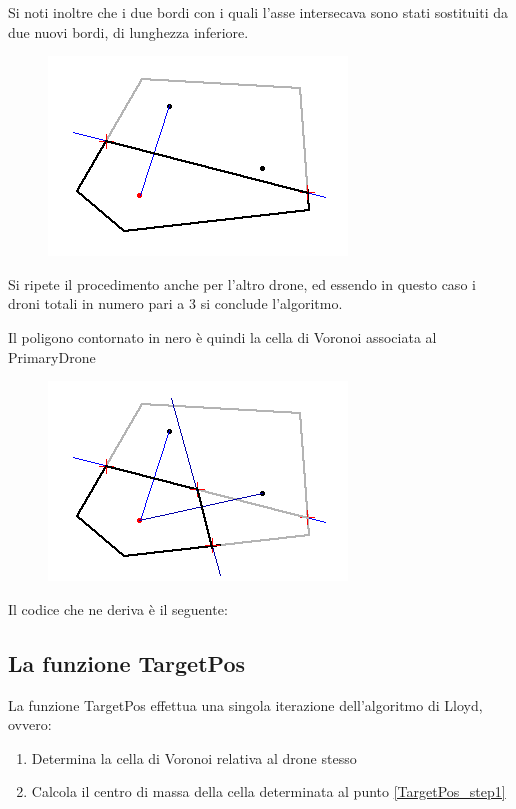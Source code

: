 \documentclass[10pt,a4paper]{article}
\newcommand{\modelicaclass}[1]{

}
\newcommand{\name}[1]{{\color{purple}#1}}
\begin{document}
Si noti inoltre che i due bordi con i quali l'asse intersecava sono stati sostituiti da due nuovi bordi, di lunghezza inferiore.

\begin{figure}[H]
\centering
\includegraphics[scale=0.7]{voronoi3.png}
\end{figure}

Si ripete il procedimento anche per l'altro drone, ed essendo in questo caso i droni totali in numero pari a 3 si conclude l'algoritmo.

Il poligono contornato in nero è quindi la cella di Voronoi associata al \name{PrimaryDrone}

\begin{figure}[H]
\centering
\includegraphics[scale=0.7]{voronoi4.png}
\end{figure}

Il codice che ne deriva è il seguente:

\modelicaclass{VoronoiCell.mo}

\subsection{La funzione \name{TargetPos}}

La funzione \name{TargetPos} effettua una singola iterazione dell'algoritmo di Lloyd, ovvero:

\begin{enumerate}
	\item \label{TargetPos_step1} Determina la cella di Voronoi relativa al drone stesso
	\item Calcola il centro di massa della cella determinata al punto \ref{TargetPos_step1}
\end{enumerate}
\end{document}
